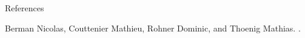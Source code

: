 \documentclass[pdftex,12pt,xcolor=pdftex,table]{beamer}
\theoremstyle{definition}
\theoremstyle{remark}
\numberwithin{equation}{section}
\numberwithin{figure}{section}
\begin{document}
	


\begin{frame}{References}

\begin{thebibliography}{10}

	
	 Berman Nicolas, Couttenier Mathieu, Rohner Dominic,
    and Thoenig Mathias.
	.
	
	

	
	
\end{thebibliography}
\end{frame}
\end{document}
